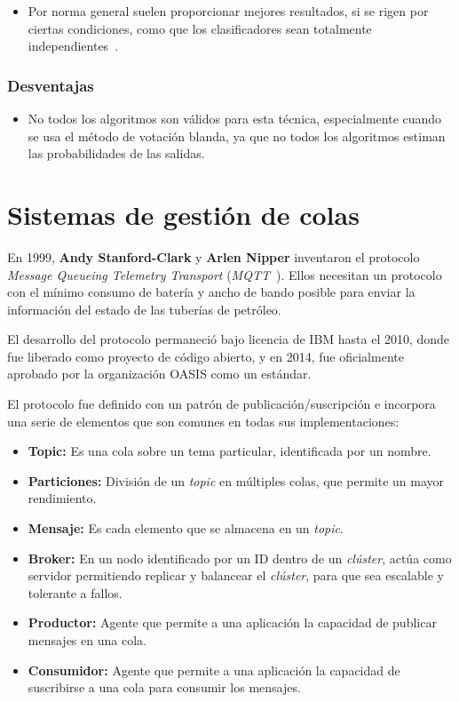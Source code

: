 \begin{itemize}
    \item Por norma general suelen proporcionar mejores resultados, si se rigen por ciertas condiciones, como que los clasificadores sean totalmente independientes~\cite{ruta2005classifier}.
\end{itemize}

\subsubsection{Desventajas}

\begin{itemize}
    \item No todos los algoritmos son válidos para esta técnica, especialmente cuando se usa el método de votación blanda, ya que no todos los algoritmos estiman las probabilidades de las salidas.
\end{itemize}


\section{Sistemas de gestión de colas}


En 1999, \textbf{Andy Stanford-Clark} y \textbf{Arlen Nipper} inventaron el protocolo \textit{Message Queueing Telemetry Transport} (\textit{MQTT}~\cite{frey2005sensor}). Ellos necesitan un protocolo con el mínimo consumo de batería y ancho de bando posible para enviar la información del estado de las tuberías de petróleo. 

El desarrollo del protocolo permaneció bajo licencia de IBM hasta el 2010, donde fue liberado como proyecto de código abierto, y en 2014, fue oficialmente aprobado por la organización OASIS como un estándar.

El protocolo fue definido con un patrón de publicación/suscripción e incorpora una serie de elementos que son comunes en todas sus implementaciones:

\begin{itemize}
    \item \textbf{Topic:} Es una cola sobre un tema particular, identificada por un nombre.
    \item \textbf{Particiones:} División de un \textit{topic} en múltiples colas, que permite un mayor rendimiento.
    \item \textbf{Mensaje:} Es cada elemento que se almacena en un \textit{topic}.
    \item \textbf{Broker:} En un nodo identificado por un ID dentro de un \textit{clúster}, actúa como servidor permitiendo replicar y balancear el \textit{clúster}, para que sea escalable y tolerante a fallos.
    \item \textbf{Productor:} Agente que permite a una aplicación la capacidad de publicar mensajes en una cola.
    \item \textbf{Consumidor:} Agente que permite a una aplicación la capacidad de suscribirse a una cola para consumir los mensajes.
\end{itemize}

